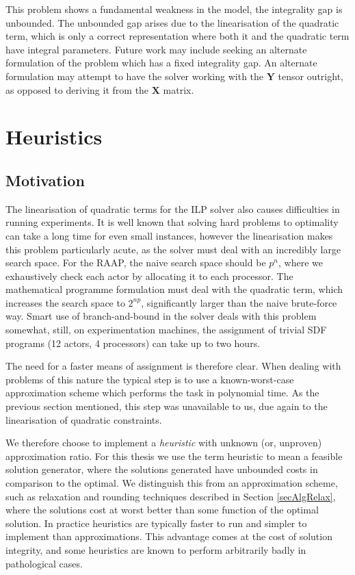This problem shows a fundamental weakness in the model, the integrality gap is unbounded.
The unbounded gap arises due to the linearisation of the quadratic term, which is only a correct representation where both it and the quadratic term have integral parameters.
Future work may include seeking an alternate formulation of the problem which has a fixed integrality gap.
An alternate formulation may attempt to have the solver working with the $\mathbf{Y}$ tensor outright, as opposed to deriving it from the $\mathbf{X}$ matrix.

\section{Heuristics}

\subsection{Motivation}

The linearisation of quadratic terms for the ILP solver also causes difficulties in running experiments.
It is well known that solving hard problems to optimality can take a long time for even small instances, however the linearisation makes this problem particularly acute, as the solver must deal with an incredibly large search space.
For the RAAP, the naive search space should be $p^n$, where we exhaustively check each actor by allocating it to each processor.
The mathematical programme formulation must deal with the quadratic term, which increases the search space to $2^{np}$, significantly larger than the naive brute-force way.
Smart use of branch-and-bound in the solver deals with this problem somewhat, still, on experimentation machines, the assignment of trivial SDF programs (12 actors, 4 processors) can take up to two hours.

The need for a faster means of assignment is therefore clear.
When dealing with problems of this nature the typical step is to use a known-worst-case approximation scheme which performs the task in polynomial time.
As the previous section mentioned, this step was unavailable to us, due again to the linearisation of quadratic constraints.

We therefore choose to implement a {\em heuristic} with unknown (or, unproven) approximation ratio.
For this thesis we use the term heuristic to mean a feasible solution generator, where the solutions generated have unbounded costs in comparison to the optimal.
We distinguish this from an approximation scheme, such as relaxation and rounding techniques described in Section \ref{secAlgRelax}, where the solutions cost at worst better than some function of the optimal solution.
In practice heuristics are typically faster to run and simpler to implement than approximations.
This advantage comes at the cost of solution integrity, and some heuristics are known to perform arbitrarily badly in pathological cases.

